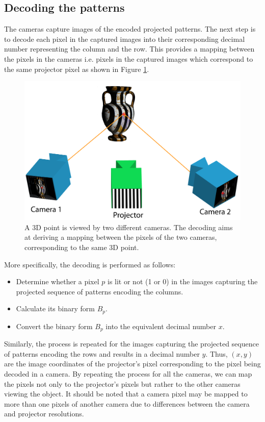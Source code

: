 \documentclass[final,12pt,3p]{elsarticle}
\begin{document}
\subsection{Decoding the patterns}
\label{subsec:decoding_patterns}

The cameras capture images of the encoded projected patterns. The next step is to decode each pixel in the captured images into their corresponding decimal number representing the column and the row. This provides a mapping between the pixels in the cameras i.e. pixels in the captured images which correspond to the same projector pixel as shown in Figure \ref{fig:decoding}.

\begin{figure}[!ht]
 \centering
 \includegraphics[scale=0.9]{./slsDiagram.png}
 \caption{\label{fig:decoding} A 3D point is viewed by two different cameras. The decoding aims at deriving a mapping between the pixels of the two cameras, corresponding to the same 3D point.}
\end{figure}

More specifically, the decoding is performed as follows: 
\begin{itemize}
	\item Determine whether a pixel $p$ is lit or not (1 or 0) in the images capturing the projected sequence of patterns encoding the columns.
	\item Calculate its binary form $B_{p}$.
	\item Convert the binary form $B_{p}$ into the equivalent decimal number $x$.
\end{itemize}
Similarly, the process is repeated for the images capturing the projected sequence of patterns encoding the rows and results in a decimal number $y$. Thus, $(x,y)$ are the image coordinates of the projector's pixel corresponding to the pixel being decoded in a camera. By repeating the process for all the cameras, we can map the pixels not only to the projector's pixels but rather to the other cameras viewing the object. It should be noted that a camera pixel may be mapped to more than one pixels of another camera due to differences between the camera and projector resolutions.
\end{document}

